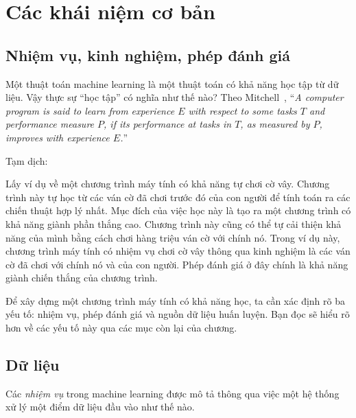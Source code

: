 
\chapter{Các khái niệm cơ bản}


\section{Nhiệm vụ, kinh nghiệm, phép đánh giá}
Một thuật toán machine learning là một thuật toán có khả năng {học tập} từ dữ
liệu. Vậy thực sự ``học tập'' có nghĩa như thế nào? Theo
Mitchell~\cite{mitchell1997machine}, ``\textit{A computer program is said to learn from
\textit{experience} $E$ with respect to some \textit{tasks} $T$ and
\textit{performance measure} $P$, if its performance at tasks in $T$, as
measured by $P$, improves with experience $E$.}''

Tạm dịch: 


Lấy ví dụ về một chương trình máy tính có khả năng tự chơi cờ vây. Chương trình này tự học từ các ván cờ đã chơi trước đó của con người để tính toán ra các chiến thuật hợp lý nhất. Mục đích của việc học này là tạo ra một chương trình có khả năng giành phần thắng cao. Chương trình này cũng có thể tự cải thiện khả năng của mình bằng cách chơi hàng triệu ván cờ với chính nó. Trong ví dụ này, chương trình máy tính có nhiệm vụ chơi cờ vây thông qua kinh nghiệm là {các ván cờ đã chơi} với chính nó và của con người. Phép đánh giá ở đây chính là khả năng giành chiến thắng của chương trình.

Để xây dựng một chương trình máy tính có khả năng học, ta cần xác định rõ ba yếu tố: nhiệm vụ, phép đánh giá và nguồn dữ liệu huấn luyện. Bạn đọc sẽ hiểu rõ hơn về các yếu tố này qua các mục còn lại của chương. 

\section{Dữ liệu}
Các \textit{nhiệm vụ} trong machine learning được mô tả thông qua việc
một hệ thống xử lý một điểm dữ liệu đầu vào như thế nào. 


